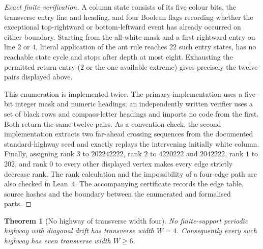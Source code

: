 \documentclass[11pt,reqno]{amsart}
\theoremstyle{plain}
\newtheorem{theorem}{Theorem}[section]
\theoremstyle{definition}
\begin{document}
\begin{proof}[Exact finite verification]
A column state consists of its five colour bits, the transverse entry line and
heading, and four Boolean flags recording whether the exceptional top-rightward or
bottom-leftward event has already occurred on either boundary.  Starting from the
all-white mask and a first rightward entry on line $2$ or $4$, literal application of
the ant rule reaches $22$ such entry states, has no reachable state cycle and stops
after depth at most eight.  Exhausting the permitted return entry ($2$ or the one
available extreme) gives precisely the twelve pairs displayed above.

This enumeration is implemented twice.  The primary implementation uses a five-bit
integer mask and numeric headings; an independently written verifier uses a set of
black rows and compass-letter headings and imports no code from the first.  Both
return the same twelve pairs.  As a convention check, the second implementation
extracts two far-ahead crossing sequences from the documented standard-highway seed
and exactly replays the intervening initially white column.  Finally, assigning rank
$3$ to $202242222$, rank $2$ to $4220222$ and $2042222$, rank $1$ to $202$, and
rank $0$ to every other displayed vertex makes every edge strictly decrease rank.
The rank calculation and the impossibility of a four-edge path are also checked in
Lean~$4$.  The accompanying certificate records the edge table, source hashes and
the boundary between the enumerated and formalised parts.
\end{proof}

\begin{theorem}[No highway of transverse width four]\label{thm:width4}
No finite-support periodic highway with diagonal drift has transverse width $W=4$.
Consequently every such highway has even transverse width $W\ge6$.
\end{theorem}
\end{document}
